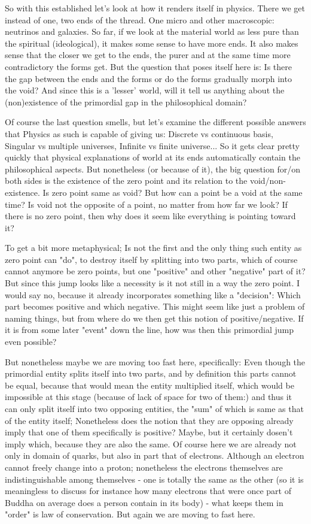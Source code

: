 \documentclass[10pt]{book}
\begin{document}
So with this established let's look at how it renders itself in physics. There we get instead of one, two ends of the thread. One micro and other macroscopic: neutrinos and galaxies. So far, if we look at the material world as less pure than the spiritual (ideological), it makes some sense to have more ends. It also makes sense that the closer we get to the ends, the purer and at the same time more contradictory the forms get. But the question that poses itself here is: Is there the gap between the ends and the forms or do the forms gradually morph into the void? And since this is a 'lesser' world, will it tell us anything about the (non)existence of the primordial gap in the philosophical domain?

Of course the last question smells, but let's examine the different possible answers that Physics as such is capable of giving us: Discrete vs continuous basis, Singular vs multiple universes, Infinite vs finite universe... So it gets clear pretty quickly that physical explanations of world at its ends automatically contain the philosophical aspects. But nonetheless (or because of it), the big question for/on both sides is the existence of the zero point and its relation to the void/non-existence. Is zero point same as void? But how can a point be a void at the same time? Is void not the opposite of a point, no matter from how far we look? If there is no zero point, then why does it seem like everything is pointing toward it?

To get a bit more metaphysical; Is not the first and the only thing such entity as zero point can "do", to destroy itself by splitting into two parts, which of course cannot anymore be zero points, but one "positive" and other "negative" part of it? But since this jump looks like a necessity is it not still in a way the zero point. I would say no, because it already incorporates something like a "decision": Which part becomes positive and which negative. This might seem like just a problem of naming things, but from where do we then get this notion of positive/negative. If it is from some later "event" down the line, how was then this primordial jump even possible?

But nonetheless maybe we are moving too fast here, specifically: Even though the primordial entity splits itself into two parts, and by definition this parts cannot be equal, because that would mean the entity multiplied itself, which would be impossible at this stage (because of lack of space for two of them:) and thus it can only split itself into two opposing entities, the "sum" of which is same as that of the entity itself; Nonetheless does the notion that they are opposing already imply that one of them specifically is positive? Maybe, but it certainly dosen't imply which, because they are also the same. Of course here we are already not only in domain of quarks, but also in part that of electrons. Although an electron cannot freely change into a proton; nonetheless the electrons themselves are indistinguishable among themselves - one is totally the same as the other (so it is meaningless to discuss for instance how many electrons that were once part of Buddha on average does a person contain in its body) - what keeps them in "order" is law of conservation. But again we are moving to fast here. 
\end{document}
